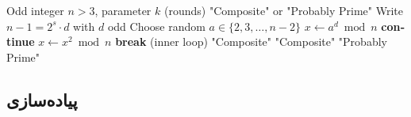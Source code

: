 \documentclass{matinbook}
\begin{document}
    \begin{latin}
        \begin{algorithm}
            \begin{algorithmic}[1]
                \Require Odd integer $n > 3$, parameter $k$ (rounds)
                \Ensure "Composite" or "Probably Prime"
                \State Write $n-1 = 2^{s} \cdot d$ with $d$ odd
                \State Choose random $a \in \{2, 3, \ldots, n-2\}$
                \State $x \gets a^{d} \bmod n$
                \State \textbf{continue}
                \EndIf
                \State $x \gets x^{2} \bmod n$
                \State \textbf{break} (inner loop)
                \EndIf
                \State \Return "Composite"
                \EndIf
                \EndFor
                \State \Return "Composite"
                \EndIf
                \EndFor
                \State \Return "Probably Prime"
            \end{algorithmic}
        \end{algorithm}
    \end{latin}
    
    \subsection{پیاده‌سازی}
    
\end{document}
